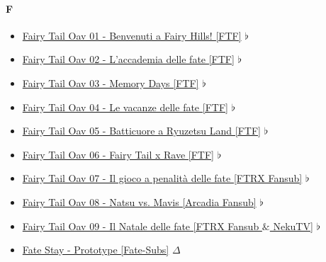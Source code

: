 		\paragraph{F} \hypertarget{OF}{}
			\begin{itemize}
				\item \href{https://mega.nz/#!l3YhVQ7b!cBbJJSkPFXU6IlIlMaW0Cnk_p9rgLEX1lcACYtm5k2U} {Fairy Tail Oav 01 - Benvenuti a Fairy Hills! [FTF]}  $\flat$   \\ 
				\item \href{https://mega.nz/#!x6IyjBQZ!5WlpvjDIngRGW-iW10aZLdrk_uRdJo3jLmF3asjO9rE} {Fairy Tail Oav 02 - L'accademia delle fate [FTF]}  $\flat$   \\ 
				\item \href{https://mega.nz/#!BrAxWTqD!Yka6zo-qxU9EJsT_95OpujJNpDc_Wg9_naaATJfS-qY} {Fairy Tail Oav 03 - Memory Days [FTF]}  $\flat$   \\ 
				\item \href{https://mega.nz/#!l25niTzJ!FsJl4F5kmOjxcdrWnGBq5PWuSuJXTp3L8XqqYchac6U} {Fairy Tail Oav 04 - Le vacanze delle fate [FTF]}  $\flat$   \\ 
				\item \href{https://mega.nz/#!5zhFSJqC!AwoDPRYpoTBW60WK3xetZ95a4ylYp7m2AUStuGfhROQ} {Fairy Tail Oav 05 - Batticuore a Ryuzetsu Land [FTF]}  $\flat$   \\ 
				\item \href{https://mega.nz/#!gzYTyBrI!E6QJEN7DWHdd8stFhf0Lx3bP4wAYXHTexm2keJfjt0M} {Fairy Tail Oav 06 - Fairy Tail x Rave [FTF]}  $\flat$   \\ 
				\item \href{https://mega.nz/#!8iIkRSJY!jqqUDtXaf_1a52h-QfH7CcHzIAb98y8k1gbTlsmTL48} {Fairy Tail Oav 07 - Il gioco a penalità delle fate [FTRX Fansub]}  $\flat$   \\ 
				\item \href{https://mega.nz/#!8zhy2SSB!_SXEAwj8-tNrIwOyeFZmil7xem-VOc9C9KMSTcdzxaI} {Fairy Tail Oav 08 - Natsu vs. Mavis [Arcadia Fansub]}  $\flat$   \\ 
				\item \href{https://mega.nz/#!MiwlzAQQ!99HsYacULxURKZyaTmbC474NsipBsXy5M3aaY1Mggt8} {Fairy Tail Oav 09 - Il Natale delle fate [FTRX Fansub $\&$ NekuTV]}  $\flat$   \\ 
				\item \href{https://mega.nz/#!PAhg0LiR!K24mVH6PK0wtIzCyvlXttxXRjCcISNTUMeRNK2iUfYo} {Fate Stay - Prototype [Fate-Subs]}  $\Delta$   \\ 

\end{itemize}
